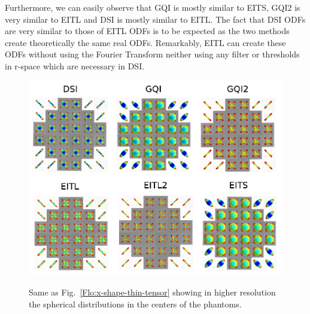 \documentclass{bioinfo}
\begin{document}
Furthermore, we can easily observe that GQI is mostly similar to EITS,
GQI2 is very similar to EITL and DSI is mostly similar to EITL. The
fact that DSI ODFs are very similar to those of EITL ODFs is to be
expected as the two methods create theoretically the same real ODFs.
Remarkably, EITL can create these ODFs without using the Fourier Transform
neither using any filter or thresholds in r-space which are necessary
in DSI.

%
\begin{figure}
[ht!]

\begin{centering}
\includegraphics[scale=1.5]{figures/software_phantom_comparisons_rician_05_zoomed}
\par\end{centering}

\caption{Same as Fig.~\ref{Flo:x-shape-thin-tensor} showing in higher resolution
the spherical distributions in the centers of the phantoms.}


\centering{}\label{Flo:x-shape-thin-tensor-zoomed}
\end{figure}
\end{document}
